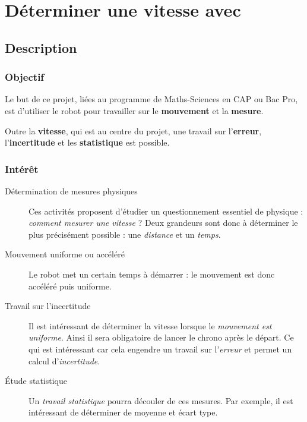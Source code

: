 \section{Déterminer une vitesse avec \mbot}


%
\pagestyle{mbot} %

\subsection{Description}

\subsubsection{Objectif}


\begin{formule}
Le but de ce projet, liées au programme de Maths-Sciences en CAP ou Bac Pro, est d'utiliser le robot \mbot pour travailler sur le \textbf{mouvement} et la \textbf{mesure}.

Outre la \textbf{vitesse}, qui est au centre du projet, une travail sur l'\textbf{erreur}, l'\textbf{incertitude} et les \textbf{statistique} est possible.
\end{formule}


\subsubsection{Intérêt}

\begin{description}
	\item [Détermination de mesures physiques] Ces activités proposent d'étudier un questionnement essentiel de physique : \emph{comment mesurer une vitesse} ? Deux grandeurs sont donc à déterminer le plus précisément possible : une \emph{distance} et un \emph{temps}.
	\item[Mouvement uniforme ou accéléré] Le robot \mbot met un certain temps à démarrer : le mouvement est donc accéléré puis uniforme. 
	\item [Travail sur l'incertitude]  
	Il est intéressant de déterminer la vitesse lorsque le \emph{mouvement est uniforme}. Ainsi il sera obligatoire de lancer le chrono après le départ. Ce qui est intéressant car cela engendre un travail sur l'\emph{erreur} et permet un calcul d'\emph{incertitude}.
	\item[Étude statistique] 	Un \emph{travail statistique} pourra découler de ces mesures. Par exemple, il est intéressant de déterminer de moyenne et écart type.
\end{description}


